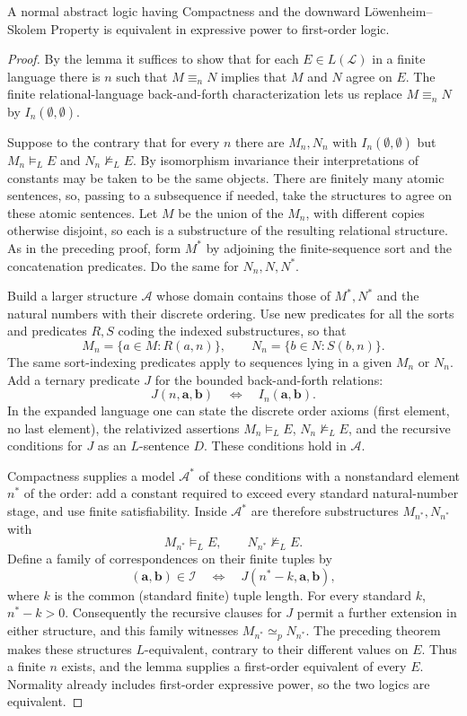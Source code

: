 \begin{theorem}
A normal abstract logic having Compactness and the downward
L\"owenheim--Skolem Property is equivalent in expressive power to
first-order logic.
\end{theorem}
\begin{proof}
By the lemma it suffices to show that for each $E\in L(\mathcal L)$
in a finite language there is $n$ such that $M\equiv_nN$ implies that
$M$ and $N$ agree on $E$. The finite relational-language back-and-forth
characterization lets us replace $M\equiv_nN$ by
$I_n(\emptyset,\emptyset)$.

Suppose to the contrary that for every $n$ there are $M_n,N_n$ with
$I_n(\emptyset,\emptyset)$ but $M_n\models_LE$ and
$N_n\not\models_LE$. By isomorphism invariance their interpretations
of constants may be taken to be the same objects. There are finitely
many atomic sentences, so, passing to a subsequence if needed, take
the structures to agree on these atomic sentences.
Let $M$ be the union of the $M_n$, with different copies otherwise
disjoint, so each is a substructure of the resulting relational
structure. As in the preceding proof, form $M^*$ by adjoining the
finite-sequence sort and the concatenation predicates. Do the same for
$N_n,N,N^*$.

Build a larger structure $\mathcal A$ whose domain contains those of
$M^*,N^*$ and the natural numbers with their discrete ordering.
Use new predicates for all the sorts and predicates $R,S$ coding the
indexed substructures, so that
\[
M_n=\{a\in M:R(a,n)\},\qquad
N_n=\{b\in N:S(b,n)\}.
\]
The same sort-indexing predicates apply to sequences lying in a given
$M_n$ or $N_n$. Add a ternary predicate $J$ for the bounded
back-and-forth relations:
\[
J(n,\mathbf a,\mathbf b)\quad\Longleftrightarrow\quad
I_n(\mathbf a,\mathbf b).
\]
In the expanded language one can state the discrete order axioms
(first element, no last element), the relativized assertions
$M_n\models_LE$, $N_n\not\models_LE$, and the recursive conditions
for $J$ as an $L$-sentence $D$. These conditions hold in $\mathcal A$.

Compactness supplies a model $\mathcal A^*$ of these conditions with a
nonstandard element $n^*$ of the order: add a constant required to
exceed every standard natural-number stage, and use finite satisfiability.
Inside $\mathcal A^*$ are therefore substructures
$M_{n^*},N_{n^*}$ with
\[
M_{n^*}\models_LE,\qquad N_{n^*}\not\models_LE.
\]
Define a family of correspondences on their finite tuples by
\[
(\mathbf a,\mathbf b)\in\mathcal I
\quad\Longleftrightarrow\quad
J(n^*-k,\mathbf a,\mathbf b),
\]
where $k$ is the common (standard finite) tuple length.
For every standard $k$, $n^*-k>0$. Consequently the recursive clauses
for $J$ permit a further extension in either structure, and this family
witnesses $M_{n^*}\simeq_pN_{n^*}$.
The preceding theorem makes these structures $L$-equivalent, contrary
to their different values on $E$. Thus a finite $n$ exists, and the
lemma supplies a first-order equivalent of every $E$.
Normality already includes first-order expressive power, so the two
logics are equivalent.
\end{proof}
